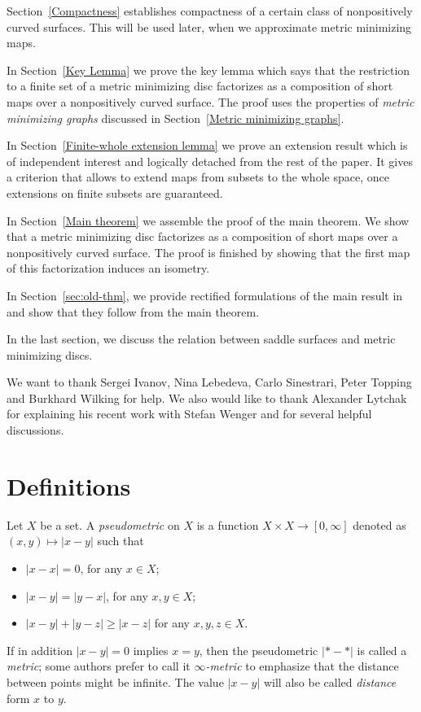 \documentclass{article}
\begin{document}
Section~\ref{Compactness} establishes compactness of a certain class of nonpositively curved surfaces.
This will be used later, when we approximate metric minimizing maps.
 
In Section~\ref{Key Lemma} we prove the key lemma which says that the restriction to a finite set of
a metric minimizing disc factorizes as a composition of short maps over a nonpositively curved surface.
The proof uses the properties of \emph{metric minimizing graphs} discussed in Section~\ref{Metric minimizing graphs}.
 
In Section~\ref{Finite-whole extension lemma} we prove an extension result which is of independent interest and logically detached
from the rest of the paper.
It gives a criterion that allows to extend maps from subsets
to the whole space, once extensions on finite subsets are guaranteed.
 
In Section~\ref{Main theorem} we assemble the proof of the main theorem.
We show that a metric minimizing disc factorizes as a composition of short maps over a
nonpositively curved surface.
The proof is finished by showing that the first map of this factorization
induces an isometry.

In Section~\ref{sec:old-thm}, we provide rectified formulations of the main result in \cite{petrunin-metric-min} and 
show that they follow from the main theorem.

In the last section, we discuss the relation between saddle surfaces and metric minimizing discs.

We want to thank 
Sergei Ivanov, 
Nina Lebedeva,
Carlo Sinestrari, 
Peter Topping 
and Burkhard Wilking 
for help.
We also would like to thank Alexander Lytchak for explaining his recent work with Stefan Wenger and for several helpful discussions.


\section{Definitions}
\label{sec:defs}

Let $X$ be a set.
A \emph{pseudometric} on $X$ 
is a function $X\times X\to[0,\infty]$ denoted as $(x,y)\mapsto |x-y|$
such that 
\begin{itemize}
\item $|x-x|=0$, for any $x\in X$;
\item $|x-y|=|y-x|$, for any $x,y\in X$;
\item $|x-y|+|y-z|\ge|x-z|$ for any  $x,y,z\in X$.
\end{itemize}
If in addition $|x-y|=0$ implies $x=y$, then the pseudometric $|{*}-{*}|$ is called a \emph{metric}; some authors prefer to call it \emph{$\infty$-metric} to emphasize that the distance between points might be infinite.
The value $|x-y|$ will also be called \emph{distance} form $x$ to $y$.
\end{document}
